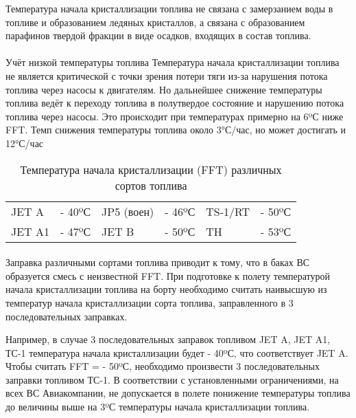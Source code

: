 Температура начала кристаллизации топлива не связана с замерзанием воды в топливе и образованием ледяных кристаллов, а связана с образованием парафинов твердой фракции в виде осадков, входящих в состав топлива.

\paragraph{} Учёт низкой температуры топлива Температура начала кристаллизации топлива не является критической с точки зрения потери тяги из-за нарушения потока топлива через насосы к двигателям. Но дальнейшее снижение температуры топлива ведёт к переходу топлива в полутвердое состояние и нарушению потока топлива через насосы. Это происходит при температурах примерно на 6ºС ниже FFT.
Темп снижения температуры топлива около 3°С/час, но может достигать и 12°С/час 


\begin{table}[H]
    
    \begin{center}
        \small  
        \caption{Температура начала кристаллизации (FFT) различных сортов топлива}     
        \begin{tabular}{|p{}p{}|p{}p{}|p{}p{}|}
            \hline
            JET A	&- 40ºС		&JP5 (воен)	&- 46ºС		&TS-1/RT	&- 50ºС\\
            JET A1	&- 47ºС		&JET B	    &- 50ºС		&TH	        &- 53ºС\\
            \hline\hline            
        \end{tabular}        
    \end{center}
\end{table}


\paragraph{} Заправка различными сортами топлива приводит к тому, что в баках ВС образуется смесь с неизвестной FFT. При подготовке к полету температурой начала кристаллизации топлива на борту необходимо считать наивысшую из температур начала кристаллизации сорта топлива, заправленного в 3 последовательных заправках.

Например, в случае 3 последовательных заправок топливом JET A, JET A1, ТС-1 температура начала кристаллизации будет - 40ºС, что соответствует JET A. Чтобы считать FFT = - 50ºС, необходимо произвести 3 последовательных заправки топливом ТС-1. В соответствии с установленными ограничениями, на всех ВС Авиакомпании, не допускается в полете понижение температуры топлива до величины выше на 3ºС температуры начала кристаллизации топлива.

